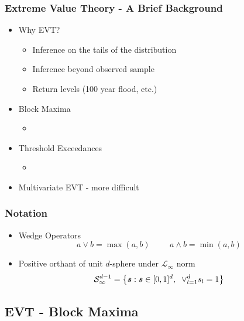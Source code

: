 \documentclass[aspectratio=169]{beamer}
\begin{document}
\begin{frame}
  \frametitle{Extreme Value Theory - A Brief Background}
  \begin{itemize}
    \item Why EVT?
        \begin{itemize}
            \item Inference on the tails of the distribution
            \item Inference beyond observed sample
            \item Return levels (100 year flood, etc.)
        \end{itemize}
    \item Block Maxima
        \begin{itemize}
            \item \citet{frechet1927,fisher1928,gumbel1942,jenkinson1955}
        \end{itemize}
    \item Threshold Exceedances
        \begin{itemize}
            \item \citet{pickands1975,balkema1974}
        \end{itemize}
    \item Multivariate EVT - more difficult
  \end{itemize}
\end{frame} %
\begin{frame}
    \frametitle{Notation}
    \begin{itemize}
      \item Wedge Operators
        \begin{equation*}
            a \vee b = \max(a,b) \hspace{1cm} a\wedge b = \min(a,b)
        \end{equation*} 
      \item Positive orthant of unit $d$-sphere under $\mathcal{L}_{\infty}$ norm
        \begin{equation*}
          \mathcal{S}_{\infty}^{d-1} = \left\lbrace \bm{s} : \bm{s} \in [0,1]^d,\hspace{0.2cm}
                            \vee_{l=1}^d s_l = 1\right\rbrace
        \end{equation*}
    \end{itemize}
    
\end{frame} %

\subsection{EVT - Block Maxima}
\end{document}
